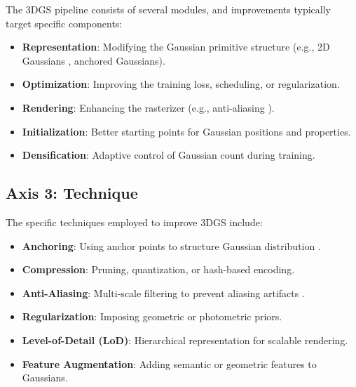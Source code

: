 The 3DGS pipeline consists of several modules, and improvements typically
target specific components:

\begin{itemize}[leftmargin=*]
    \item \textbf{Representation}: Modifying the Gaussian primitive
          structure (e.g., 2D Gaussians \cite{huang20242dgs},
          anchored Gaussians).
    \item \textbf{Optimization}: Improving the training loss, scheduling,
          or regularization.
    \item \textbf{Rendering}: Enhancing the rasterizer (e.g.,
          anti-aliasing \cite{yu2024mipsplatting}).
    \item \textbf{Initialization}: Better starting points for Gaussian
          positions and properties.
    \item \textbf{Densification}: Adaptive control of Gaussian count
          during training.
\end{itemize}

\subsection{Axis 3: Technique}
\label{sec:taxonomy:technique}

The specific techniques employed to improve 3DGS include:

\begin{itemize}[leftmargin=*]
    \item \textbf{Anchoring}: Using anchor points to structure Gaussian
          distribution \cite{yu2024scaffold}.
    \item \textbf{Compression}: Pruning, quantization, or hash-based
          encoding.
    \item \textbf{Anti-Aliasing}: Multi-scale filtering to prevent
          aliasing artifacts \cite{yu2024mipsplatting}.
    \item \textbf{Regularization}: Imposing geometric or photometric
          priors.
    \item \textbf{Level-of-Detail (LoD)}: Hierarchical representation
          for scalable rendering.
    \item \textbf{Feature Augmentation}: Adding semantic or geometric
          features to Gaussians.
\end{itemize}

